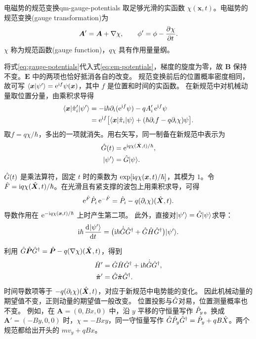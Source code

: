 \begin{definition}{电磁势的规范变换}{qm-gauge-potentials}
    取足够光滑的实函数 $\chi(\bm x,t)$。电磁势的规范变换(gauge transformation)为
    \begin{equation}
        \bm A' = \bm A + \nabla\chi,\qquad \phi' = \phi - \frac{\partial^{}\chi}{\partial{t}^{}}.
        \label{eq:gauge-potentials}
    \end{equation}
    $\chi$ 称为规范函数(gauge function)，$q\chi$ 具有作用量量纲。
\end{definition}
将式\eqref{eq:gauge-potentials}代入式\eqref{eq:em-potentials}，梯度的旋度为零，故 $\bm B$ 保持不变。$\bm E$ 中的两项也恰好抵消各自的改变。
规范变换前后的位置概率密度相同，故可写 $\langle\bm x\vert\psi'\rangle = \mathop{}\!\mathrm{e}^{\mathrm{i} f}\psi(\bm x)$，其中 $f$ 是位置和时间的实函数。
在新规范中对机械动量取位置分量，由乘积求导得
\[
    \begin{aligned}
        \langle\bm x\vert\hat{\pi}_i'\vert\psi'\rangle
            &= -\mathrm{i}\hbar\partial_i(\mathop{}\!\mathrm{e}^{\mathrm{i} f}\psi) - qA_i'\mathop{}\!\mathrm{e}^{\mathrm{i} f}\psi\\
            &= \mathop{}\!\mathrm{e}^{\mathrm{i} f}\bigl[\langle\bm x\vert\hat{\pi}_i\vert\psi\rangle + (\hbar\partial_i f - q\partial_i\chi)\psi\bigr].
    \end{aligned}
\]
取$f = q\chi/\hbar$，多出的一项就消失。用右矢写，同一制备在新规范中表示为
\begin{subequations}
    \begin{align}
        \hat{G}(t) &= \mathop{}\!\mathrm{e}^{\mathrm{i} q\chi(\hat{\bm{X}},t)/\hbar},\\
        \lvert\psi'\rangle &= \hat{G}\lvert\psi\rangle.
    \end{align}
\end{subequations}

$\hat{G}(t)$ 是乘法算符，固定 $t$ 时的乘数为 $\exp[\mathrm{i} q\chi(\bm x,t)/\hbar]$，其模为 $1$。令 $\hat{F} = \mathrm{i} q\chi(\hat{\bm{X}},t)/\hbar$。在光滑且有紧支撑的波包上用乘积求导，可得
\begin{equation}
    \mathop{}\!\mathrm{e}^{\hat{F}}\hat{P}_i\mathop{}\!\mathrm{e}^{-\hat{F}}
    = \hat{P}_i - q(\partial_i\chi)(\hat{\bm{X}},t).
\end{equation}
导数作用在 $\mathop{}\!\mathrm{e}^{-\mathrm{i} q\chi(\bm x,t)/\hbar}$ 上时产生第二项。
此外，直接对$\lvert\psi'\rangle = \hat{G}\lvert\psi\rangle$求导：
\[
    \mathrm{i}\hbar\,\frac{\mathop{}\!\mathrm{d}^{}\lvert\psi'\rangle}{\mathrm{d}{t}^{}}
    = \bigl(\mathrm{i}\hbar\dot{\hat{G}}\hat{G}^\dagger + \hat{G}\hat{H}\hat{G}^\dagger\bigr)\lvert\psi^\prime\rangle.
\]

利用 $\hat{G}\hat{\bm{P}}\hat{G}^\dagger = \hat{\bm{P}} - q(\nabla\chi)(\hat{\bm{X}},t)$，得到
\begin{subequations}
    \begin{align}
        \hat{H}^\prime &= \hat{G}\hat{H}\hat{G}^\dagger + \mathrm{i}\hbar\dot{\hat{G}}\hat{G}^\dagger,\\
        \hat{\bm{\pi}}' &= \hat{G}\hat{\bm{\pi}} \hat{G}^\dagger.
    \end{align}
\end{subequations}
时间导数项等于 $-q(\partial_t\chi)(\hat{\bm{X}},t)$，对应于新规范中电势能的变化。
因此机械动量的期望值不变，正则动量的期望值一般改变。
位置投影与$\hat{G}$对易，位置测量概率也不变。
例如，在 $\bm A = (0,Bx,0)$ 中，沿 $y$ 平移的守恒量写作 $\hat{P}_y$。换成 $\bm A' = (-By,0,0)$ 时，$\chi = -Bxy$，同一守恒量写作 $\hat{G}\hat{P}_y\hat{G}^\dagger = \hat{P}_y + qB\hat{X}$。两个规范都给出开头的 $mv_y + qBx$。

